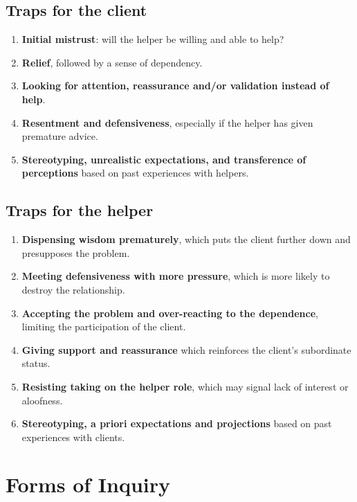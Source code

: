 \documentclass{article}
\newenvironment{nosepenumerate}
{ \begin{enumerate}
    \setlength{\itemsep}{0pt}
    \setlength{\parskip}{0pt}
    \setlength{\parsep}{0pt}     }
{ \end{enumerate}                  }
\begin{document}
\begin{multicols}{2}

\subsection{Traps for the client}
\begin{nosepenumerate}
    \item \textbf{Initial mistrust}: will the helper be willing and able to help?
    \item \textbf{Relief}, followed by a sense of dependency.
    \item \textbf{Looking for attention, reassurance and/or validation instead of help}.
    \item \textbf{Resentment and defensiveness}, especially if the helper has given premature advice.
    \item \textbf{Stereotyping, unrealistic expectations, and transference of perceptions} based on past experiences with helpers.
\end{nosepenumerate}

\vfill

\subsection{Traps for the helper}
\begin{nosepenumerate}
    \item \textbf{Dispensing wisdom prematurely}, which puts the client further down and presupposes the problem.
    \item \textbf{Meeting defensiveness with more pressure}, which is more likely to destroy the relationship.
    \item \textbf{Accepting the problem and over-reacting to the dependence}, limiting the participation of the client.
    \item \textbf{Giving support and reassurance} which reinforces the client's subordinate status.
    \item \textbf{Resisting taking on the helper role}, which may signal lack of interest or aloofness.
    \item \textbf{Stereotyping, a priori expectations and projections} based on past experiences with clients.
\end{nosepenumerate}

\end{multicols}

\section{Forms of Inquiry}
\end{document}
